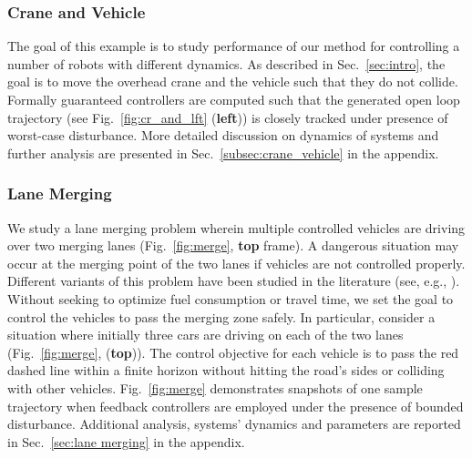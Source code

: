 \subsubsection{Crane and Vehicle}
The goal of this example is to study performance of our method for controlling a number of robots with different dynamics. As described in Sec.~\ref{sec:intro}, the goal is to move the overhead crane
and the vehicle such that they do not collide.
Formally guaranteed controllers are computed such that the generated open loop trajectory (see Fig.~\ref{fig:cr_and_lft} (\textbf{left})) is closely tracked under presence of worst-case disturbance. More detailed discussion on dynamics of systems and further analysis are presented in Sec.~\ref{subsec:crane_vehicle} in the appendix.

\subsubsection{Lane Merging}
\label{subsec:lane merging}
We study a lane merging problem wherein multiple controlled vehicles are driving over two merging lanes (Fig.~\ref{fig:merge}, \textbf{top} frame). A dangerous situation may occur at the merging point of the two lanes if vehicles are not controlled properly. Different variants of this problem have been studied in the literature (see, e.g., \cite{xiao2019merging,xiao2020merging}). Without seeking to optimize fuel consumption or travel time, we set the goal to control the vehicles to pass the merging zone safely. In particular, consider a situation where initially three cars are driving on each of the two lanes (Fig.~\ref{fig:merge}, (\textbf{top})). The control objective for each vehicle is to pass the red dashed line within a finite horizon without hitting the road's sides or colliding with other vehicles. Fig.~\ref{fig:merge} demonstrates snapshots of one sample trajectory when feedback controllers are employed under the presence of bounded disturbance. Additional analysis, systems' dynamics and parameters are reported in Sec.~\ref{sec:lane merging} in the appendix.

